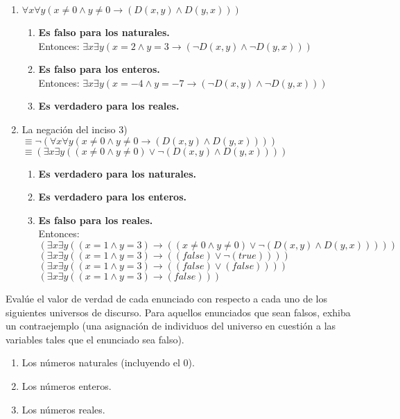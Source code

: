 \documentclass[a4paper,10pt]{article}
\begin{document}
\begin{enumerate}
\begin{enumerate}[label=\arabic*)]
    \item $\forall x \forall y \left(x \neq 0 \wedge y\neq 0 \to \left(D\left(x,y\right) \wedge D\left(y,x\right)\right)\right)$
    \begin{enumerate}[label=\alph*)]
      \item \textbf{Es falso para los naturales.}\\
      Entonces: $\exists x \exists y (x = 2 \wedge y = 3 \to (\neg D(x,y) \wedge \neg D(y,x)))$
      \item \textbf{Es falso para los enteros.}\\
      Entonces: $\exists x \exists y (x = -4 \wedge y = -7 \to (\neg D(x,y) \wedge \neg D(y,x)))$
      \item \textbf{Es verdadero para los reales.}\\
      
    \end{enumerate}

    \item La negaci\'on del inciso 3)\\
    $\equiv \neg (\forall x \forall y (x\neq 0 \wedge y \neq 0 \to (D(x,y) \wedge D(y,x))))$\\
    $\equiv (\exists x \exists y ((x\neq 0 \wedge y \neq 0) \lor \neg (D(x,y) \wedge D(y,x))))$\\
    
    \begin{enumerate}[label=\alph*)]
      \item \textbf{Es verdadero para los naturales.}
      \item \textbf{Es verdadero para los enteros.}
      \item \textbf{Es falso para los reales.}\\
      Entonces:\\
      $(\exists x \exists y ((x = 1 \wedge y = 3) \to ((x\neq 0 \wedge y \neq 0) \lor \neg (D(x,y) \wedge D(y,x)))))$\\
      $(\exists x \exists y ((x = 1 \wedge y = 3) \to ((false) \lor \neg (true))))$\\
      $(\exists x \exists y ((x = 1 \wedge y = 3) \to ((false) \lor (false))))$\\
      $(\exists x \exists y ((x = 1 \wedge y = 3) \to (false)))$\\

    \end{enumerate}
  \end{enumerate}

  Eval\'ue el valor de verdad de cada enunciado con respecto a cada uno de los siguientes universos de discurso. Para aquellos enunciados que sean falsos, exhiba un contraejemplo (una asignaci\'on de individuos del universo en cuesti\'on a las variables tales que el enunciado sea falso).
  \begin{enumerate}
    \item Los n\'umeros naturales (incluyendo el 0).
    \item Los n\'umeros enteros.
    \item Los n\'umeros reales.
  \end{enumerate}
    

\end{enumerate}
\end{document}
